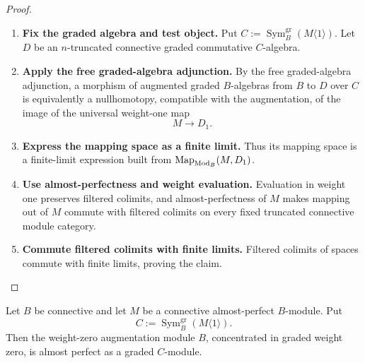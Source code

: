 \begin{proof}
\leavevmode
\begin{enumerate}[label=\textup{(\arabic*)}]
    \item \textbf{Fix the graded algebra and test object.}
    Put \(C:=\operatorname{Sym}^{\mathrm{gr}}_B(M\langle1\rangle)\). Let \(D\) be an
    \(n\)-truncated connective graded commutative \(C\)-algebra.
    \item \textbf{Apply the free graded-algebra adjunction.}
    By the free
    graded-algebra adjunction, a morphism of augmented graded \(B\)-algebras from
    \(B\) to \(D\) over \(C\) is equivalently a nullhomotopy, compatible with the
    augmentation, of the image of the universal weight-one map
    \[
        M\longrightarrow D_1.
    \]
    \item \textbf{Express the mapping space as a finite limit.}
    Thus its mapping space is a finite-limit expression built from
    \(\operatorname{Map}_{\operatorname{Mod}_B}(M,D_1)\).
    \item \textbf{Use almost-perfectness and weight evaluation.}
    Evaluation in weight one preserves filtered colimits, and
    almost-perfectness of \(M\) makes mapping out of \(M\) commute with filtered
    colimits on every fixed truncated connective module category.
    \item \textbf{Commute filtered colimits with finite limits.}
    Filtered
    colimits of spaces commute with finite limits, proving the claim.
\end{enumerate}
\end{proof}

\begin{lemma}
\label{lem:positive-graded-symmetric-augmentation-module}
Let \(B\) be connective and let \(M\) be a connective almost-perfect
\(B\)-module. Put
\[
    C:=\operatorname{Sym}^{\mathrm{gr}}_B(M\langle1\rangle).
\]
Then the weight-zero augmentation module \(B\), concentrated in graded
weight zero, is almost perfect as a graded \(C\)-module.
\end{lemma}

